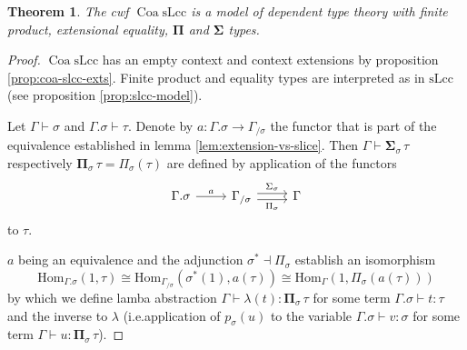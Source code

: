 \documentclass[a4paper]{article}
\newtheorem{theorem}{Theorem}
\theoremstyle{remark}
\theoremstyle{definition}
\begin{document}
\begin{theorem}
  \label{th:lcc-supports-types}
  The cwf $\operatorname{Coa} \mathrm{sLcc}$ is a model of dependent type theory with finite product, extensional equality, $\mathbf{\Pi}$ and $\mathbf{\Sigma}$ types.
\end{theorem}
\begin{proof}
  $\operatorname{Coa} \mathrm{sLcc}$ has an empty context and context extensions by proposition \ref{prop:coa-slcc-exts}.
  Finite product and equality types are interpreted as in $\mathrm{sLcc}$ (see proposition \ref{prop:slcc-model}).

  Let $\Gamma \vdash \sigma$ and $\Gamma.\sigma \vdash \tau$.
  Denote by $a : \Gamma.\sigma \rightarrow \Gamma_{/ \sigma}$ the functor that is part of the equivalence established in lemma \ref{lem:extension-vs-slice}.
  Then $\Gamma \vdash \mathbf{\Sigma}_\sigma \, \tau$ respectively $\mathbf{\Pi}_\sigma \, \tau = \Pi_\sigma(\tau)$ are defined by application of the functors
  \begin{equation}
    \begin{tikzcd}
      \Gamma.\sigma \arrow[r, "a"] & \Gamma_{/ \sigma} \arrow[r, shift left, "\Sigma_\sigma"] \arrow[r, shift right, "\Pi_\sigma"'] & \Gamma
    \end{tikzcd}
  \end{equation}
  to $\tau$.

  $a$ being an equivalence and the adjunction $\sigma^* \dashv \Pi_\sigma$ establish an isomorphism
  \begin{equation}
    \mathrm{Hom}_{\Gamma.\sigma}(1, \tau) \cong \mathrm{Hom}_{\Gamma_{/ \sigma}}(\sigma^*(1), a(\tau)) \cong \mathrm{Hom}_{\Gamma}(1, \Pi_\sigma(a(\tau)))
  \end{equation}
  by which we define lamba abstraction $\Gamma \vdash \lambda(t) : \mathbf{\Pi}_\sigma \, \tau$ for some term $\Gamma.\sigma \vdash t : \tau$ and the inverse to $\lambda$ (i.e.\@ application of $p_\sigma(u)$ to the variable $\Gamma.\sigma \vdash v : \sigma$ for some term $\Gamma \vdash u : \mathbf{\Pi}_\sigma \, \tau$).


\end{proof}
\end{document}
